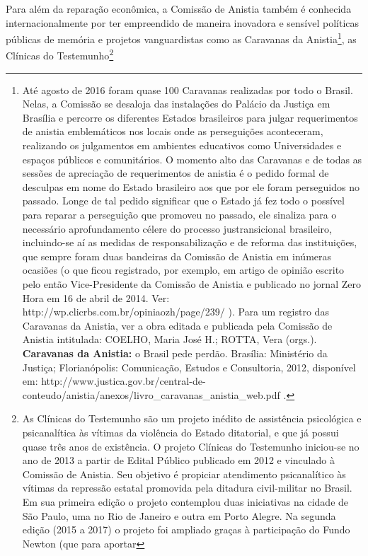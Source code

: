 Para além da reparação econômica, a Comissão de Anistia também é
conhecida internacionalmente por ter empreendido de maneira inovadora e
sensível políticas públicas de memória e projetos vanguardistas como as
Caravanas da Anistia\footnote{Até agosto de 2016 foram quase 100
  Caravanas realizadas por todo o Brasil. Nelas, a Comissão se desaloja
  das instalações do Palácio da Justiça em Brasília e percorre os
  diferentes Estados brasileiros para julgar requerimentos de anistia
  emblemáticos nos locais onde as perseguições aconteceram, realizando
  os julgamentos em ambientes educativos como Universidades e espaços
  públicos e comunitários. O momento alto das Caravanas e de todas as
  sessões de apreciação de requerimentos de anistia é o pedido formal de
  desculpas em nome do Estado brasileiro aos que por ele foram
  perseguidos no passado. Longe de tal pedido significar que o Estado já
  fez todo o possível para reparar a perseguição que promoveu no
  passado, ele sinaliza para o necessário aprofundamento célere do
  processo justransicional brasileiro, incluindo-se aí as medidas de
  responsabilização e de reforma das instituições, que sempre foram duas
  bandeiras da Comissão de Anistia em inúmeras ocasiões (o que ficou
  registrado, por exemplo, em artigo de opinião escrito pelo então
  Vice-Presidente da Comissão de Anistia e publicado no jornal Zero Hora
  em 16 de abril de 2014. Ver:
  http://wp.clicrbs.com.br/opiniaozh/page/239/ ). Para um registro das
  Caravanas da Anistia, ver a obra editada e publicada pela Comissão de
  Anistia intitulada: COELHO, Maria José H.; ROTTA, Vera (orgs.).
  \textbf{Caravanas da Anistia:} o Brasil pede perdão. Brasília:
  Ministério da Justiça; Florianópolis: Comunicação, Estudos e
  Consultoria, 2012, disponível em:
  http://www.justica.gov.br/central-de-conteudo/anistia/anexos/livro\_caravanas\_anistia\_web.pdf
  .}, as Clínicas do Testemunho\footnote{As Clínicas do Testemunho são
  um projeto inédito de assistência psicológica e psicanalítica às
  vítimas da violência do Estado ditatorial, e que já possui quase três
  anos de existência. O projeto Clínicas do Testemunho iniciou-se no ano
  de 2013 a partir de Edital Público publicado em 2012 e vinculado à
  Comissão de Anistia. Seu objetivo é propiciar atendimento
  psicanalítico às vítimas da repressão estatal promovida pela ditadura
  civil-militar no Brasil. Em sua primeira edição o projeto contemplou
  duas iniciativas na cidade de São Paulo, uma no Rio de Janeiro e outra
  em Porto Alegre. Na segunda edição (2015 a 2017) o projeto foi
  ampliado graças à participação do Fundo Newton (que para aportar
}
